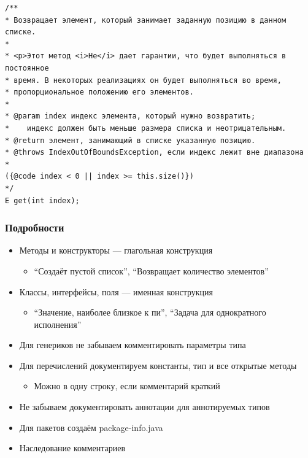 \documentclass[xetex,mathserif,serif]{beamer}
\begin{document}
	\begin{frame}[fragile]
		\begin{footnotesize}
			\begin{verbatim}
/**
* Возвращает элемент, который занимает заданную позицию в данном списке.
*
* <р>Этот метод <i>He</i> дает гарантии, что будет выполняться в постоянное
* время. В некоторых реализациях он будет выполняться во время,
* пропорциональное положению его элементов.
*
* @param index индекс элемента, который нужно возвратить;
*    индекс должен быть меньше размера списка и неотрицательным.
* @return элемент, занимающий в списке указанную позицию.
* @throws IndexOutOfBoundsException, если индекс лежит вне диапазона
*
({@code index < 0 || index >= this.size()})
*/
E get(int index);
			\end{verbatim}
		\end{footnotesize}
	\end{frame}

	\begin{frame}
		\frametitle{Подробности}
		\begin{itemize}
			\item Методы и конструкторы --- глагольная конструкция
			\begin{itemize}
				\item ``Создаёт пустой список'', ``Возвращает количество элементов''
			\end{itemize}
			\item Классы, интерфейсы, поля --- именная конструкция
			\begin{itemize}
				\item ``Значение, наиболее близкое к пи'', ``Задача для однократного исполнения''
			\end{itemize}
			\item Для генериков не забываем комментировать параметры типа
			\item Для перечислений документируем константы, тип и все открытые методы
			\begin{itemize}
				\item Можно в одну строку, если комментарий краткий
			\end{itemize}
			\item Не забываем документировать аннотации для аннотируемых типов
			\item Для пакетов создаём package-info.java
			\item Наследование комментариев
		\end{itemize}
	\end{frame}
\end{document}
